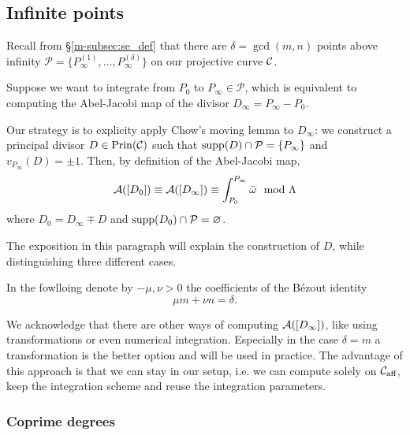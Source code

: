 \documentclass[main.tex]{subfiles}
\begin{document}
  
  
  \subsection{Infinite points}\label{subsec:ajm_infty}

  Recall from \S \ref{m-subsec:se_def} that there are $\delta = \gcd(m,n)$ points above infinity $\mathcal{P}
  = \{ P_{\infty}^{(1)},\dots, P_{\infty}^{(\delta)} \}$ on our projective curve $\mathcal{C}$.
  
  Suppose we want to integrate from $P_0$ to $P_{\infty} \in \mathcal{P}$, which is equivalent to computing the Abel-Jacobi map of the divisor
  $D_{\infty} = P_{\infty} - P_0$.

  Our strategy is to explicity apply Chow's moving lemma to $D_{\infty}$: we construct a principal divisor $D \in \operatorname{Prin}(\mathcal{C})$ such that $\operatorname{supp}(D) \cap \mathcal{P} = \{ P_{\infty} \}$
  and $v_{P_{\infty}}(D) = \pm 1$. Then, by definition of the Abel-Jacobi map,
  \begin{equation}
  \mathcal{A}([D_0]) \equiv \mathcal{A}([D_{\infty}]) \equiv \int_{P_0}^{P_{\infty}} \bar{\omega} \mod \Lambda
  \end{equation}
  where $D_0 = D_{\infty} \mp D$ and $\operatorname{supp}(D_0) \cap \mathcal{P} = \varnothing$.
  
  The exposition in this paragraph will explain the construction of $D$, while distinguishing three different cases.
  
  In the fowlloing denote by  $-\mu,\nu > 0$ the coefficients of the Bézout identity
  \begin{equation}
    \mu m + \nu n = \delta.
  \end{equation}
  
  \begin{rmk}
   We acknowledge that there are other ways of computing $\mathcal{A}([D_{\infty}])$, like using transformations or even numerical
   integration. Especially in the case $\delta = m$ a transformation is the better option and will be used in practice.
   The advantage of this approach is that we can stay in our setup, i.e. we can compute solely on $\mathcal{C}_{\text{aff}}$,
   keep the integration scheme and reuse the integration parameters.
  \end{rmk}

  
  
  \subsubsection{Coprime degrees}\label{subsec:ajm_inf_cop}
  
\end{document}
